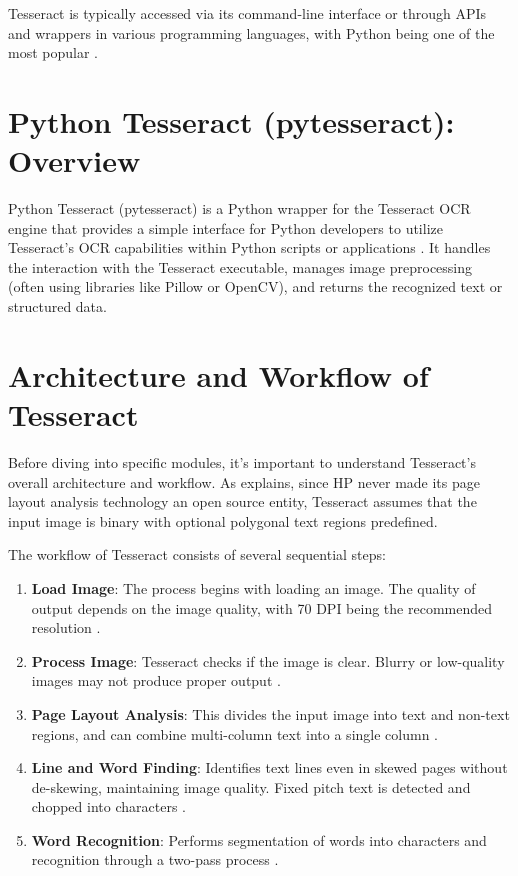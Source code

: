 \documentclass{article}
\begin{document}
	Tesseract is typically accessed via its command-line interface or through APIs and wrappers in various programming languages, with Python being one of the most popular \cite {Anitha:2024, DataCamp:2024}.
	
	\section{Python Tesseract (pytesseract): Overview}
	
	Python Tesseract (pytesseract) is a Python wrapper for the Tesseract OCR engine that provides a simple interface for Python developers to utilize Tesseract's OCR capabilities within Python scripts or applications \cite {Nutrient:2025}. It handles the interaction with the Tesseract executable, manages image preprocessing (often using libraries like Pillow or OpenCV), and returns the recognized text or structured data.
	
	\section{Architecture and Workflow of Tesseract}
	
	Before diving into specific modules, it's important to understand Tesseract's overall architecture and workflow. As \citet{Joshi:2021} explains, since HP never made its page layout analysis technology an open source entity, Tesseract assumes that the input image is binary with optional polygonal text regions predefined.
	
	The workflow of Tesseract consists of several sequential steps:
	\begin{enumerate}
		\item \textbf{Load Image}: The process begins with loading an image. The quality of output depends on the image quality, with 70 DPI being the recommended resolution \cite {Joshi:2021}.
		\item \textbf{Process Image}: Tesseract checks if the image is clear. Blurry or low-quality images may not produce proper output \cite {Smith:1987, Joshi:2021}.
		\item \textbf{Page Layout Analysis}: This divides the input image into text and non-text regions, and can combine multi-column text into a single column \cite {Joshi:2021}.
		\item \textbf{Line and Word Finding}: Identifies text lines even in skewed pages without de-skewing, maintaining image quality. Fixed pitch text is detected and chopped into characters \cite {Joshi:2021}.
		\item \textbf{Word Recognition}: Performs segmentation of words into characters and recognition through a two-pass process \cite {Joshi:2021}.
	\end{enumerate}
	
\end{document}

